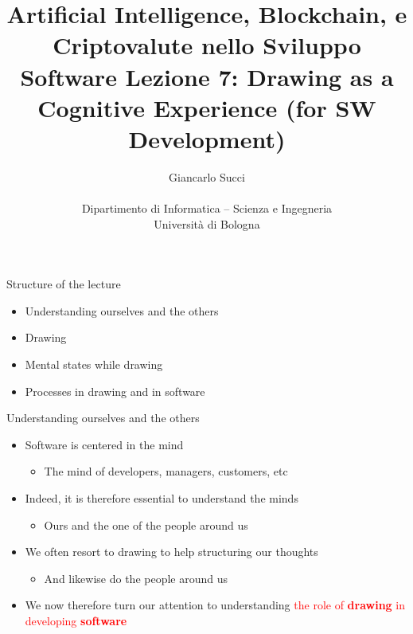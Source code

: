 \documentclass{beamer}
\title[L07]{Artificial Intelligence, Blockchain, e Criptovalute nello Sviluppo Software \newline\newline
Lezione 7: Drawing as a Cognitive Experience (for SW Development)} %
\author[{\tiny Giancarlo Succi }]{Giancarlo Succi\\\\ Dipartimento di Informatica -- Scienza e Ingegneria\\Universit\`{a} di Bologna\\
\bftt{g.succi@unibo.it}
} %
\institute[unibo] %
\date{} %
\begin{document}
\begin{frame}
\titlepage %

\end{frame}





\begin{frame}
{\centerline{Structure of the lecture}}
\begin{itemize}
    \item Understanding ourselves and the others
    \item Drawing
    \item Mental states while drawing
    \item Processes in drawing and in software
    \end{itemize}
\end{frame}

\begin{frame}
{\centerline{Understanding ourselves and the others}}
 
\begin{itemize}
\item Software is centered in the mind
\begin{itemize}
\item The mind of developers, managers, customers, etc
\end{itemize} 
\item Indeed, it is therefore essential to understand the minds
\begin{itemize}
\item Ours and the one of the people around us
\end{itemize} 
\item We often resort to drawing to help structuring our thoughts
\begin{itemize}
\item And likewise do the people around us
\end{itemize} 
\item We now therefore turn our attention to understanding \textcolor{red}{the role of \textbf{drawing} in developing \textbf{software}}
\end{itemize} 

\end{frame}
\end{document}
